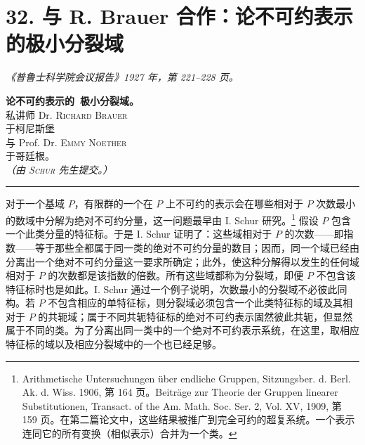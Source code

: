 \documentclass[11pt]{article}
\begin{document}
\setcounter{footnote}{0}

\section*{32. 与 R. Brauer 合作：论不可约表示的极小分裂域}
\emph{《普鲁士科学院会议报告》1927 年，第 221--228 页。}

\begin{center}
{\Large\bfseries 论不可约表示的\
极小分裂域。}\\[1.0em]
私讲师 Dr. \textsc{Richard Brauer}\\
于柯尼斯堡\\
与 Prof. Dr. \textsc{Emmy Noether}\\
于哥廷根。\\[0.8em]
\emph{（由 \textsc{Schur} 先生提交。）}\\[0.5em]
\rule{4em}{0.4pt}
\end{center}

对于一个基域 $P$，有限群的一个在 $P$ 上不可约的表示会在哪些相对于 $P$ 次数最小的数域中分解为绝对不可约分量，这一问题最早由 I. Schur 研究。\footnote{Arithmetische Untersuchungen über endliche Gruppen, Sitzungsber. d. Berl. Ak. d. Wiss. 1906, 第 164 页。Beiträge zur Theorie der Gruppen linearer Substitutionen, Transact. of the Am. Math. Soc. Ser. 2, Vol. XV, 1909, 第 159 页。在第二篇论文中，这些结果被推广到完全可约的超复系统。一个表示连同它的所有变换（相似表示）合并为一个类。} 假设 $P$ 包含一个此类分量的特征标。于是 I. Schur 证明了：这些域相对于 $P$ 的次数——即指数——等于那些全都属于同一类的绝对不可约分量的数目；因而，同一个域已经由分离出一个绝对不可约分量这一要求所确定；此外，使这种分解得以发生的任何域相对于 $P$ 的次数都是该指数的倍数。所有这些域都称为分裂域，即便 $P$ 不包含该特征标时也是如此。I. Schur 通过一个例子说明，次数最小的分裂域不必彼此同构。若 $P$ 不包含相应的单特征标，则分裂域必须包含一个此类特征标的域及其相对于 $P$ 的共轭域；属于不同共轭特征标的绝对不可约表示固然彼此共轭，但显然属于不同的类。为了分离出同一类中的一个绝对不可约表示系统，在这里，取相应特征标的域以及相应分裂域中的一个也已经足够。
\end{document}
